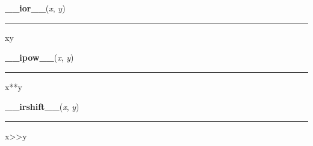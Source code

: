     \label{numpy:ndarray:__ior__}

    \vspace{0.5ex}

    \begin{boxedminipage}{\textwidth}

    \raggedright \textbf{\_\_ior\_\_}(\textit{x}, \textit{y})

    \vspace{-1.5ex}

    \rule{\textwidth}{0.5\fboxrule}

x{\textbar}y
    \vspace{1ex}

    \end{boxedminipage}

    \label{numpy:ndarray:__ipow__}

    \vspace{0.5ex}

    \begin{boxedminipage}{\textwidth}

    \raggedright \textbf{\_\_ipow\_\_}(\textit{x}, \textit{y})

    \vspace{-1.5ex}

    \rule{\textwidth}{0.5\fboxrule}

x**y
    \vspace{1ex}

    \end{boxedminipage}

    \label{numpy:ndarray:__irshift__}

    \vspace{0.5ex}

    \begin{boxedminipage}{\textwidth}

    \raggedright \textbf{\_\_irshift\_\_}(\textit{x}, \textit{y})

    \vspace{-1.5ex}

    \rule{\textwidth}{0.5\fboxrule}

x{\textgreater}{\textgreater}y
    \vspace{1ex}

    \end{boxedminipage}

    \label{numpy:ndarray:__isub__}

